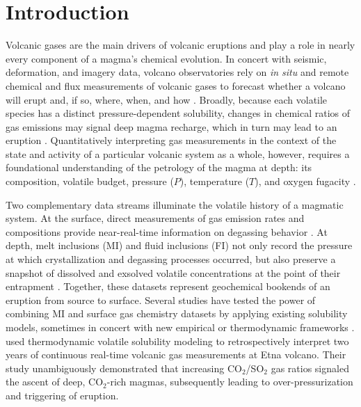 \documentclass[draft, english]{volcanica-template}
\begin{document}
\hypertarget{introduction}{%
\section{Introduction}}
Volcanic gases are the main drivers of volcanic eruptions and play a role in nearly every component of a magma's chemical evolution. In concert with seismic, deformation, and imagery data, volcano observatories rely on \textit{in situ} and remote chemical and flux measurements of volcanic gases to forecast whether a volcano will erupt and, if so, where, when, and how \parencite{Kern2022,Aiuppa2025a,Aiuppa2025b,acocella2024towards,poland2020partly,kilburn2022forecasting}. Broadly, because each volatile species has a distinct pressure-dependent solubility, changes in chemical ratios of gas emissions may signal deep magma recharge, which in turn may lead to an eruption \parencite{Aiuppa2007,Giggenbach1996,demoor2016turmoil}. Quantitatively interpreting gas measurements in the context of the state and activity of a particular volcanic system as a whole, however, requires a foundational understanding of the petrology of the magma at depth: its composition, volatile budget, pressure ($P$), temperature ($T$), and oxygen fugacity \parencite[$f$O$_2$, a measure of redox state;][]{Aiuppa2007,iacovino2015,Werner2020,hughes2024modeling,Ding2025,lerner2021petrologic,demoor2016turmoil}. 

Two complementary data streams illuminate the volatile history of a magmatic system. At the surface, direct measurements of gas emission rates and compositions provide near-real-time information on degassing behavior \parencite{aiuppa2010unusually,allard2016degassing,fischer1996relationship,werner2011gas,werner2013degassing}. At depth, melt inclusions (MI) and fluid inclusions (FI) not only record the pressure at which crystallization and degassing processes occurred, but also preserve a snapshot of dissolved and exsolved volatile concentrations at the point of their entrapment \parencite{roedder1979origin,lowenstern1995applications,metrich2008volatile,rose2021silicate,wieser2021reconstructing,wieser2025fluid}. Together, these datasets represent geochemical bookends of an eruption from source to surface. Several studies have tested the power of combining MI and surface gas chemistry datasets by applying existing solubility models, sometimes in concert with new empirical or thermodynamic frameworks \parencite{iacovino2015,Werner2020,shinohara2003variation,aiuppa2010model,burton2007role,oppenheimer2011mantle,wardell2001white}. \textcite{Aiuppa2007} used thermodynamic volatile solubility modeling \parencite{moretti2003model} to retrospectively interpret two years of continuous real-time volcanic gas measurements at Etna volcano. Their study unambiguously demonstrated that increasing CO$_2$/SO$_2$ gas ratios signaled the ascent of deep, CO$_2$-rich magmas, subsequently leading to over-pressurization and triggering of eruption. 
\end{document}
